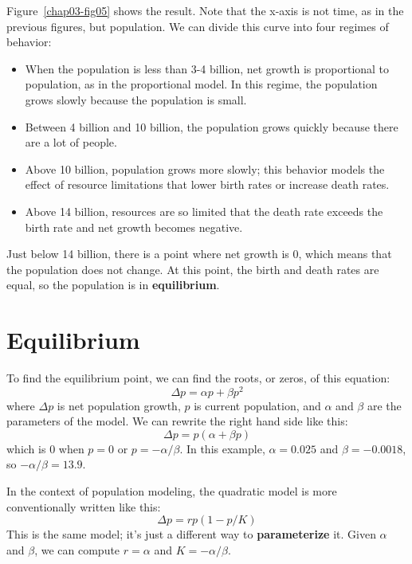 \documentclass[12pt]{book}
\theoremstyle{exercise}
\begin{document}
Figure~\ref{chap03-fig05} shows the result.  Note that the x-axis is not time, as in the previous figures, but population.  We can divide this curve into four regimes of behavior:

\begin{itemize}

\item When the population is less than 3-4 billion, net growth is proportional to population, as in the proportional model.  In this regime,  the population grows slowly because the population is small.

\item Between 4 billion and 10 billion, the population grows quickly because there are a lot of people.

\item Above 10 billion, population grows more slowly; this behavior models the effect of resource limitations that lower birth rates or increase death rates.

\item Above 14 billion, resources are so limited that the death rate exceeds the birth rate and net growth becomes negative.

\end{itemize}

Just below 14 billion, there is a point where net growth is 0, which means that the population does not change.  At this point, the birth and death rates are equal, so the population is in {\bf equilibrium}.



\section{Equilibrium}
\label{equilibrium}

To find the equilibrium point, we can find the roots, or zeros, of this equation:
%
\[ \Delta p = \alpha p + \beta p^2 \]
%
where $\Delta p$ is net population growth, $p$ is current population, and $\alpha$ and $\beta$ are the parameters of the model.  We can rewrite the right hand side like this:
%
\[ \Delta p = p (\alpha + \beta p) \]
%
which is $0$ when $p=0$ or $p=-\alpha/\beta$.  In this example, $\alpha = 0.025$ and $\beta = -0.0018$, so $-\alpha/\beta = 13.9$.

In the context of population modeling, the quadratic model is more conventionally written like this:
%
\[ \Delta p = r p (1 - p / K) \]
%
This is the same model; it's just a different way to {\bf parameterize} it.  Given $\alpha$ and $\beta$, we can compute $r=\alpha$ and $K=-\alpha/\beta$.
\end{document}
